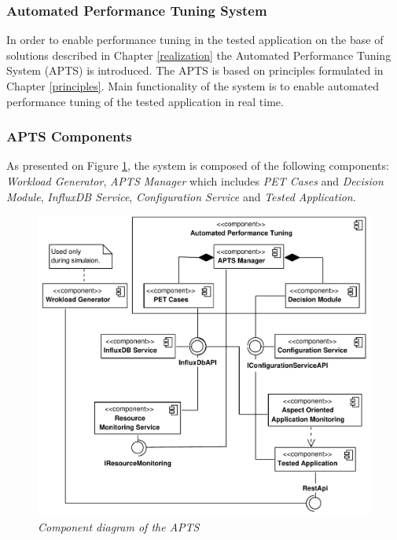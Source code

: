 \documentclass[10pt,a4paper]{article}
\begin{document}
\subsubsection{Automated Performance Tuning System}

In order to enable performance tuning in the tested application on the base of solutions described in Chapter \ref{realization} the Automated Performance Tuning System (APTS) is introduced. The APTS is based on principles formulated in Chapter \ref{principles}. Main functionality of the system is to enable automated  performance tuning of the tested application in real time. 

\subsubsection{APTS Components}

As presented on Figure \ref{componentapts}, the system is composed of the following components: \textit{Workload Generator}, \textit{APTS Manager} which includes \textit{PET Cases} and \textit{Decision Module}, \textit{InfluxDB Service}, \textit{Configuration Service} and \textit{Tested Application}. 

\begin{figure}[!htb]
\centering
\includegraphics[width=1\textwidth]{APTSComponentDiagram}
\caption{\textit{Component diagram of the APTS}}
\label{componentapts}
\end{figure}
\end{document}
